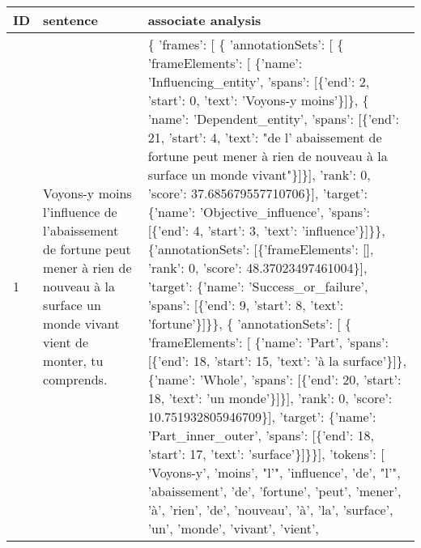 \documentclass{article}%
\begin{document}
\begin{longtable}{|l |p{5.5cm} |p{9cm}|}%
\hline%
ID&sentence&associate analysis\\%
\hline%
\endhead%
\hline%
\endfoot%
\endlastfoot%
\rowcolor{lightgray}%
1&Voyons{-}y moins l'influence de l'abaissement de fortune peut mener à rien de nouveau à la surface un monde vivant vient de monter, tu comprends.&\{ 'frames': {[} \{ 'annotationSets': {[} \{ 'frameElements': {[} \{'name': 'Influencing\_entity', 'spans': {[}\{'end': 2, 'start': 0, 'text': 'Voyons{-}y moins'\}{]}\},\newline%
                                                         \{ 'name': 'Dependent\_entity',\newline%
                                                           'spans': {[}\{'end': 21, 'start': 4, 'text': "de l' abaissement de fortune peut mener à rien de nouveau à la surface un monde vivant"\}{]}\}{]},\newline%
                                      'rank': 0,\newline%
                                      'score': 37.685679557710706\}{]},\newline%
                'target': \{'name': 'Objective\_influence', 'spans': {[}\{'end': 4, 'start': 3, 'text': 'influence'\}{]}\}\},\newline%
              \{'annotationSets': {[}\{'frameElements': {[}{]}, 'rank': 0, 'score': 48.37023497461004\}{]}, 'target': \{'name': 'Success\_or\_failure', 'spans': {[}\{'end': 9, 'start': 8, 'text': 'fortune'\}{]}\}\},\newline%
              \{ 'annotationSets': {[} \{ 'frameElements': {[} \{'name': 'Part', 'spans': {[}\{'end': 18, 'start': 15, 'text': 'à la surface'\}{]}\},\newline%
                                                         \{'name': 'Whole', 'spans': {[}\{'end': 20, 'start': 18, 'text': 'un monde'\}{]}\}{]},\newline%
                                      'rank': 0,\newline%
                                      'score': 10.751932805946709\}{]},\newline%
                'target': \{'name': 'Part\_inner\_outer', 'spans': {[}\{'end': 18, 'start': 17, 'text': 'surface'\}{]}\}\}{]},\newline%
  'tokens': {[} 'Voyons{-}y', 'moins', "l'", 'influence', 'de', "l'", 'abaissement', 'de', 'fortune', 'peut', 'mener', 'à', 'rien', 'de', 'nouveau', 'à', 'la', 'surface', 'un', 'monde', 'vivant', 'vient',\newline%

\end{longtable}
\end{document}
